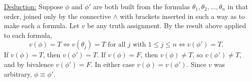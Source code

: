 \documentclass{article}
\theoremstyle{remark}\newtheorem{remark}{Remark}
\theoremstyle{plain}
\begin{document}
\noindent\underline{Deduction:}
Suppose $\phi$ and $\phi'$ are both built from the formulas $\theta_1, \theta_2, \ldots, \theta_n$ in that order, joined only by the connective $\land$ with brackets inserted in such a way as to make each a formula. Let $v$ be any truth assignment. By the result above applied to each formula,
\[
    v(\phi) = T \iff v(\theta_j) = T \text{ for all } j \text{ with } 1 \leq j \leq n \iff v(\phi') = T.
\]
If $v(\phi) = T$, then $v(\phi') = T$. If $v(\phi) = F$, then $v(\phi) \neq T$, so $v(\phi') \neq T$, and by bivalence $v(\phi') = F$. In either case $v(\phi) = v(\phi')$. Since $v$ was arbitrary, $\phi \equiv \phi'$.
\end{document}
